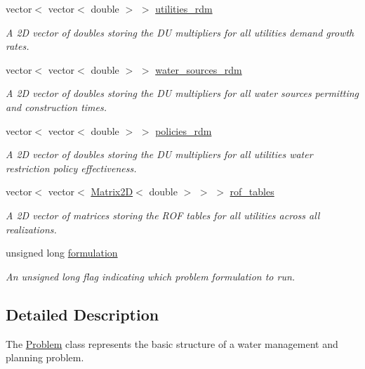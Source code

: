 \begin{DoxyCompactItemize}
vector$<$ vector$<$ double $>$ $>$ \mbox{\hyperlink{classProblem_aa4f6db22580c8d8a941e83556f4f5208}{utilities\+\_\+rdm}}
\begin{DoxyCompactList}\small\item\em A 2D vector of doubles storing the DU multipliers for all utilities\textquotesingle{} demand growth rates. \end{DoxyCompactList}\item 
vector$<$ vector$<$ double $>$ $>$ \mbox{\hyperlink{classProblem_ace43e5306285f0d91a199a4bd5a38922}{water\+\_\+sources\+\_\+rdm}}
\begin{DoxyCompactList}\small\item\em A 2D vector of doubles storing the DU multipliers for all water sources\textquotesingle{} permitting and construction times. \end{DoxyCompactList}\item 
vector$<$ vector$<$ double $>$ $>$ \mbox{\hyperlink{classProblem_a63d49161a5d6d98e26cd218d90a13bae}{policies\+\_\+rdm}}
\begin{DoxyCompactList}\small\item\em A 2D vector of doubles storing the DU multipliers for all utilities\textquotesingle{} water restriction policy effectiveness. \end{DoxyCompactList}\item 
vector$<$ vector$<$ \mbox{\hyperlink{classMatrix2D}{Matrix2D}}$<$ double $>$ $>$ $>$ \mbox{\hyperlink{classProblem_a0a64a8c04964a326879eccccf5437c93}{rof\+\_\+tables}}
\begin{DoxyCompactList}\small\item\em A 2D vector of matrices storing the R\+OF tables for all utilities across all realizations. \end{DoxyCompactList}\item 
unsigned long \mbox{\hyperlink{classProblem_a3c013ea45ae840c261341bf31eaec87b}{formulation}}
\begin{DoxyCompactList}\small\item\em An unsigned long flag indicating which problem formulation to run. \end{DoxyCompactList}\end{DoxyCompactItemize}


\subsection{Detailed Description}
The {\ttfamily \mbox{\hyperlink{classProblem}{Problem}}} class represents the basic structure of a water management and planning problem. 

